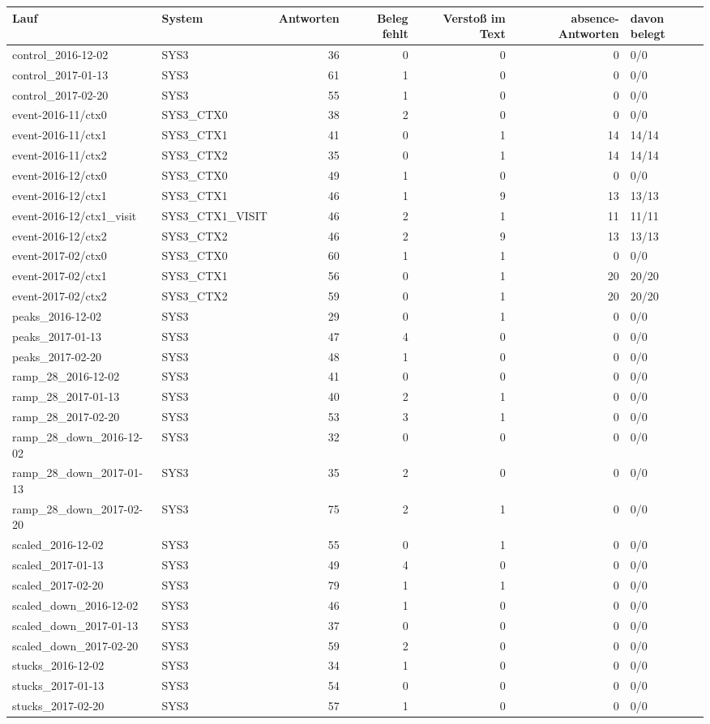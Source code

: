 \begin{tabular}{llrrrrl}
\toprule
Lauf & System & Antworten & Beleg fehlt & Verstoß im Text & absence-Antworten & davon belegt \\
\midrule
control\_2016-12-02 & SYS3 & 36 & 0 & 0 & 0 & 0/0 \\
control\_2017-01-13 & SYS3 & 61 & 1 & 0 & 0 & 0/0 \\
control\_2017-02-20 & SYS3 & 55 & 1 & 0 & 0 & 0/0 \\
event-2016-11/ctx0 & SYS3\_CTX0 & 38 & 2 & 0 & 0 & 0/0 \\
event-2016-11/ctx1 & SYS3\_CTX1 & 41 & 0 & 1 & 14 & 14/14 \\
event-2016-11/ctx2 & SYS3\_CTX2 & 35 & 0 & 1 & 14 & 14/14 \\
event-2016-12/ctx0 & SYS3\_CTX0 & 49 & 1 & 0 & 0 & 0/0 \\
event-2016-12/ctx1 & SYS3\_CTX1 & 46 & 1 & 9 & 13 & 13/13 \\
event-2016-12/ctx1\_visit & SYS3\_CTX1\_VISIT & 46 & 2 & 1 & 11 & 11/11 \\
event-2016-12/ctx2 & SYS3\_CTX2 & 46 & 2 & 9 & 13 & 13/13 \\
event-2017-02/ctx0 & SYS3\_CTX0 & 60 & 1 & 1 & 0 & 0/0 \\
event-2017-02/ctx1 & SYS3\_CTX1 & 56 & 0 & 1 & 20 & 20/20 \\
event-2017-02/ctx2 & SYS3\_CTX2 & 59 & 0 & 1 & 20 & 20/20 \\
peaks\_2016-12-02 & SYS3 & 29 & 0 & 1 & 0 & 0/0 \\
peaks\_2017-01-13 & SYS3 & 47 & 4 & 0 & 0 & 0/0 \\
peaks\_2017-02-20 & SYS3 & 48 & 1 & 0 & 0 & 0/0 \\
ramp\_28\_2016-12-02 & SYS3 & 41 & 0 & 0 & 0 & 0/0 \\
ramp\_28\_2017-01-13 & SYS3 & 40 & 2 & 1 & 0 & 0/0 \\
ramp\_28\_2017-02-20 & SYS3 & 53 & 3 & 1 & 0 & 0/0 \\
ramp\_28\_down\_2016-12-02 & SYS3 & 32 & 0 & 0 & 0 & 0/0 \\
ramp\_28\_down\_2017-01-13 & SYS3 & 35 & 2 & 0 & 0 & 0/0 \\
ramp\_28\_down\_2017-02-20 & SYS3 & 75 & 2 & 1 & 0 & 0/0 \\
scaled\_2016-12-02 & SYS3 & 55 & 0 & 1 & 0 & 0/0 \\
scaled\_2017-01-13 & SYS3 & 49 & 4 & 0 & 0 & 0/0 \\
scaled\_2017-02-20 & SYS3 & 79 & 1 & 1 & 0 & 0/0 \\
scaled\_down\_2016-12-02 & SYS3 & 46 & 1 & 0 & 0 & 0/0 \\
scaled\_down\_2017-01-13 & SYS3 & 37 & 0 & 0 & 0 & 0/0 \\
scaled\_down\_2017-02-20 & SYS3 & 59 & 2 & 0 & 0 & 0/0 \\
stucks\_2016-12-02 & SYS3 & 34 & 1 & 0 & 0 & 0/0 \\
stucks\_2017-01-13 & SYS3 & 54 & 0 & 0 & 0 & 0/0 \\
stucks\_2017-02-20 & SYS3 & 57 & 1 & 0 & 0 & 0/0 \\
\bottomrule
\end{tabular}
